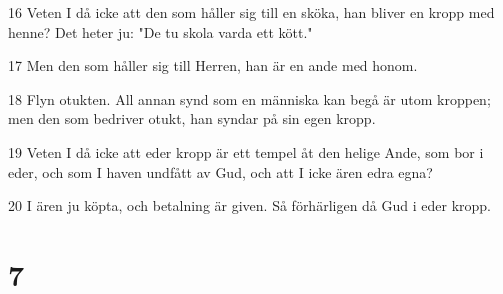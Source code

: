 \par 16 Veten I då icke att den som håller sig till en sköka, han bliver en kropp med henne? Det heter ju: "De tu skola varda ett kött."
\par 17 Men den som håller sig till Herren, han är en ande med honom.
\par 18 Flyn otukten. All annan synd som en människa kan begå är utom kroppen; men den som bedriver otukt, han syndar på sin egen kropp.
\par 19 Veten I då icke att eder kropp är ett tempel åt den helige Ande, som bor i eder, och som I haven undfått av Gud, och att I icke ären edra egna?
\par 20 I ären ju köpta, och betalning är given. Så förhärligen då Gud i eder kropp.

\chapter{7}

